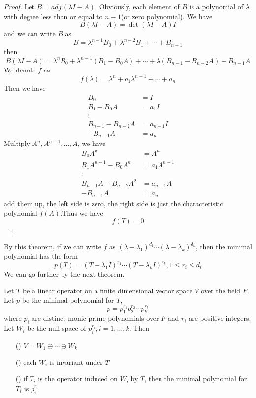 \documentclass{article}
\begin{document}
\begin{proof}
	Let $B=adj\,(\lambda I-A)$. Obviously, each element of $B$ is a polynomial of $\lambda$ with degree less than or equal to $n-1$(or zero polynomial). We have
	\[B(\lambda I-A)=\det(\lambda I-A)I\]
	and we can write $B$ as
	\[B=\lambda^{n-1}B_0+\lambda^{n-2}B_1+\cdots+B_{n-1}\]
	then
	\[B(\lambda I-A)=\lambda^nB_0+\lambda^{n-1}(B_1-B_0A)+\cdots+\lambda(B_{n-1}-B_{n-2}A)-B_{n-1}A\]
	We denote $f$ as
	\[f(\lambda)=\lambda^n+a_1\lambda^{n-1}+\cdots+a_{n}\]
	Then we have
	\begin{align*}
		B_0&=I\\
		B_1-B_0A&=a_1I\\
		\vdots\\
		B_{n-1}-B_{n-2}A&=a_{n-1}I\\
		-B_{n-1}A&=a_n
	\end{align*}
	Multiply $A^n,A^{n-1},\dots,A$, we have
	\begin{align*}
		B_0A^n&=A^n\\
		B_1A^{n-1}-B_0A^n&=a_1A^{n-1}\\
		\vdots\\
		B_{n-1}A-B_{n-2}A^2&=a_{n-1}A\\
		-B_{n-1}A&=a_n
	\end{align*}
	add them up, the left side is zero, the right side is just the characteristic polynomial $f(A)$.Thus we have
	\[f(T)=0\] 
\end{proof}
By this theorem, if we can write $f$ as $(\lambda-\lambda_1)^{d_1}\cdots(\lambda-\lambda_k)^{d_k}$, then the minimal polynomial has the form
\[p(T)=(T-\lambda_1I)^{r_1}\cdots(T-\lambda_kI)^{r_k},1\le r_i\le d_i\]
We can go further by the next theorem.
\begin{thm}\label{PrimeDecomposition}
	Let $T$ be a linear operator on a finite dimensional vector space $V$ over the field $F$. Let $p$ be the minimal polynomial for $T$,
	\[p=p_1^{r_1}p_2^{r_2}\cdots p_k^{r_k}\]
	where $p_i$ are distinct monic prime polynomials over $F$ and $r_i$ are positive integers. Let $W_i$ be the null space of $p_i^{r_i},i=1,\dots,k$. Then
	\begin{enumerate}
		\item [(\romannumeral1)]$V=W_1\oplus\cdots\oplus W_k$
		\item [(\romannumeral2)]each $W_i$ is invariant under $T$
		\item [(\romannumeral3)]if $T_i$ is the operator induced on $W_i$ by $T$, then the minimal polynomial for $T_i$ is $p_i^{r_i}$
	\end{enumerate}
\end{thm}
\end{document}
